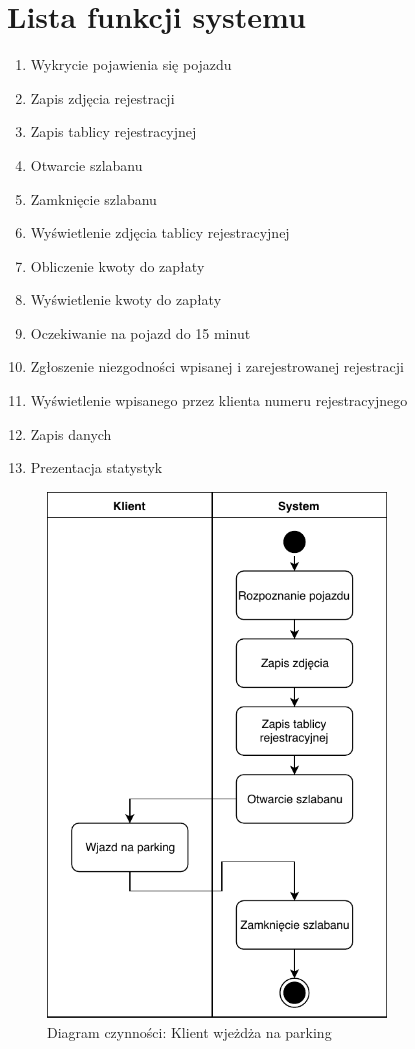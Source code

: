 \section{Lista funkcji systemu}


\begin{enumerate}
	\item Wykrycie pojawienia się pojazdu
	\item Zapis zdjęcia rejestracji
	\item Zapis tablicy rejestracyjnej
	\item Otwarcie szlabanu
	\item Zamknięcie szlabanu
	\item Wyświetlenie zdjęcia tablicy rejestracyjnej
	\item Obliczenie kwoty do zapłaty
	\item Wyświetlenie kwoty do zapłaty
	\item Oczekiwanie na pojazd do 15 minut
	\item Zgłoszenie niezgodności wpisanej i zarejestrowanej rejestracji
	\item Wyświetlenie wpisanego przez klienta numeru rejestracyjnego
	\item Zapis danych
	\item Prezentacja statystyk
\end{enumerate}

\begin{figure}[H]
	\centering
	\includegraphics[width=90mm]{diagramy/DiagCzynWjazd.pdf}
	\caption{Diagram czynności: Klient wjeżdża na parking \label{overflow}}
\end{figure}


